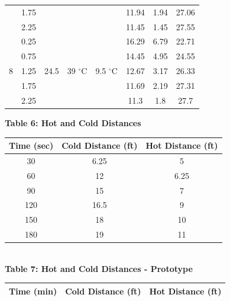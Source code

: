 \documentclass{article}
\begin{document}
\begin{center}
\begin{tabular}{|c|ccccccc|}
           & 1.75  &      &         &         & 11.94 & 1.94    & 27.06       \\
           & 2.25  &      &         &         & 11.45 & 1.45    & 27.55       \\\hline
    \multirow{ 5}{*}{8}        & 0.25  & \multirow{ 5}{*}{24.5}          & \multirow{ 5}{*}{39 $^\circ$C}        & \multirow{ 5}{*}{9.5 $^\circ$C}        & 16.29 & 6.79    & 22.71       \\
           & 0.75  &      &         &        & 14.45 & 4.95    & 24.55       \\
           & 1.25  &      &         &        & 12.67 & 3.17    & 26.33       \\
           & 1.75  &      &         &        & 11.69 & 2.19    & 27.31       \\
           & 2.25  &      &         &        & 11.3  & 1.8     & 27.7         \\\hline
\end{tabular}
\newpage
\doublespacing
{} 
{\bf {\large Table 6: Hot and Cold Distances\\}}
\vspace{3mm}
\begin{tabular}{|ccc|}
    \hline
    \textbf{Time (sec)} & \textbf{Cold Distance (ft)} & \textbf{Hot Distance (ft)}  \\\hline
    30           & 6.25               & 5                  \\
    60           & 12                 & 6.25               \\
    90           & 15                 & 7                  \\
    120          & 16.5               & 9                  \\
    150          & 18                 & 10                 \\
    180          & 19                 & 11                \\\hline
\end{tabular}
\vspace{10mm}
{\bf {\large \\ Table 7: Hot and Cold Distances - Prototype\\}}
\vspace{3mm}
\begin{tabular}{|ccc|}
    \hline
    \textbf{Time (min)} & \textbf{Cold Distance (ft)} & \textbf{Hot Distance (ft)}\\\hline

\end{tabular}
\end{center}
\end{document}
